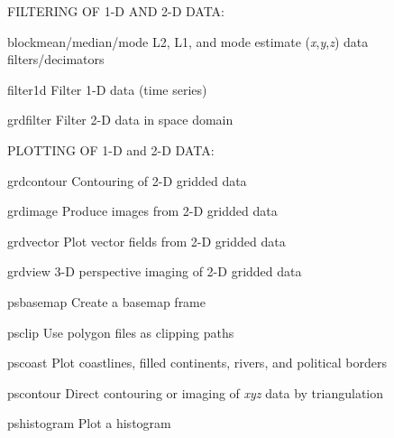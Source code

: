\documentclass{article}
\begin{document}
\par FILTERING OF 1-D AND 2-D DATA:\par 

\par 	blockmean/median/mode	L2, L1, and mode estimate (\emph{x},\emph{y},\emph{z}) data filters/decimators\par 

\par 	filter1d	Filter 1-D data (time series)\par 

\par 	grdfilter	Filter 2-D data in space domain\par 

\par \par 

\par PLOTTING OF 1-D and 2-D DATA:\par 

\par 	grdcontour	Contouring of 2-D gridded data \par 

\par 	grdimage	Produce images from 2-D gridded data \par 

\par 	grdvector	Plot vector fields from 2-D gridded data\par 

\par 	grdview	3-D perspective imaging of 2-D gridded data \par 

\par 	psbasemap	Create a basemap frame\par 

\par 	psclip	Use polygon files as clipping paths\par 

\par 	pscoast	Plot coastlines, filled continents, rivers, and political borders\par 

\par 	pscontour	Direct contouring or imaging of \emph{xyz} data by triangulation \par 

\par 	pshistogram	Plot a histogram\par 
\end{document}
